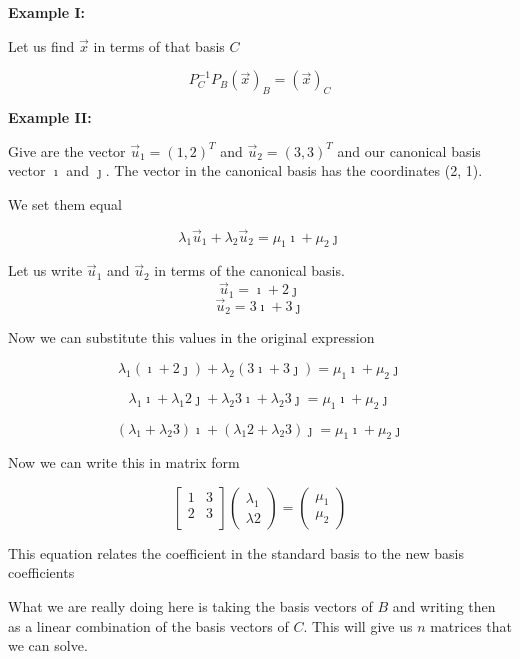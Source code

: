\textbf{Example I:}
\vspace{\baselineskip}

Let us find \(\vec{x}\) in terms of that basis \(C\)

\[P_{C}^{-1} P_B {(\vec{x})}_B = {(\vec{x})}_C\]

\textbf{Example II:}
\vspace{\baselineskip}

Give are the vector \(\vec{u}_1 = {(1,2)}^T\) and \(\vec{u}_2 = {(3, 3)}^T\)
and our canonical basis vector \(\imath\) and \(\jmath\). The
vector in the canonical basis has the coordinates (2, 1). 
\vspace{\baselineskip}

We set them equal

\[\lambda_1 \vec{u}_1 + \lambda_2 \vec{u}_2 = \mu_1 \imath + \mu_2 \jmath \]

Let us write \(\vec{u}_1\) and \(\vec{u}_2\) in terms of the canonical basis.
\[\vec{u}_1 = \imath + 2 \jmath\]
\[\vec{u}_2 = 3 \imath + 3 \jmath\]

Now we can substitute this values in the original expression

\[\lambda_1 (\imath + 2 \jmath) + \lambda_2 (3 \imath + 3 \jmath) = \mu_1 \imath + \mu_2 \jmath \]

\[\lambda_1 \imath + \lambda_1 2 \jmath + \lambda_2 3 \imath + \lambda_2 3 \jmath = \mu_1 \imath + \mu_2 \jmath \]

\[(\lambda_1  +  \lambda_2 3)\imath + (\lambda_1 2  + \lambda_2 3) \jmath = \mu_1 \imath + \mu_2 \jmath \]

Now we can write this in matrix form

\[
\begin{bmatrix}
    1 & 3 \\
    2 & 3 \\
\end{bmatrix} \begin{pmatrix}
    \lambda_1 \\ \lambda2
\end{pmatrix} = \begin{pmatrix}
    \mu_1 \\ \mu_2
\end{pmatrix}
\]

This equation relates the coefficient in the standard basis to the new basis
coefficients
\vspace{\baselineskip}

What we are really doing here is taking the basis vectors of \(B\) and writing then as a linear combination
of the basis vectors of \(C\). This will give us \(n\) matrices that we can solve.
\vspace{\baselineskip}


